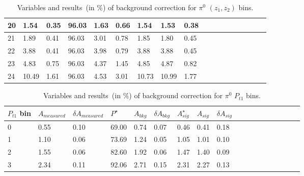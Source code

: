 \begin{table}[H]
\begin{tabular}{|l|l|l|l|l|l|l|l|l|l|l|l|l|l|l|l|l|l|}
20 & 1.54 & 0.35 & 96.03 & 1.63 & 0.66 & 1.54 & 1.53 & 0.38 \\ \hline 
21 & 1.89 & 0.41 & 96.03 & 3.01 & 0.78 & 1.85 & 1.80 & 0.45 \\ \hline 
22 & 3.88 & 0.41 & 96.03 & 3.98 & 0.79 & 3.88 & 3.88 & 0.45 \\ \hline 
23 & 4.83 & 0.75 & 96.03 & 4.37 & 1.45 & 4.85 & 4.87 & 0.82 \\ \hline 
24 & 10.49 & 1.61 & 96.03 & 4.53 & 3.01 & 10.73 & 10.99 & 1.77 \\ \hline 
\end{tabular}
\caption{Variables and results~(in $\%$) of background correction for $\pi^0$ $(z_1,z_2)$ bins. }
\label{tab:comzbkgcor}
\end{table} 

\begin{table}[H]\footnotesize
\centering
\begin{tabular}{|l|l|l|l|l|l|l|l|l|l|l|l|l|l|l|l|l|l|}
\\ \hline
$P_{t1}$ bin & $A_{measured}$ & $\delta A_{measured}$ & $P^{\star}$& $A_{bkg}$ & $\delta A_{bkg}$ & $A_{sig}^{\star}$ & $ A_{sig}$ & $\delta A_{sig}$ \\ \hline
0 & 0.55 & 0.10 & 69.00 & 0.74 & 0.07 & 0.46 & 0.41 & 0.18 \\ \hline 
1 & 1.10 & 0.06 & 73.69 & 1.24 & 0.05 & 1.05 & 1.01 & 0.10 \\ \hline 
2 & 1.55 & 0.06 & 82.60 & 1.92 & 0.06 & 1.47 & 1.40 & 0.09 \\ \hline 
3 & 2.34 & 0.11 & 92.06 & 2.71 & 0.15 & 2.31 & 2.27 & 0.13 \\ \hline 
\end{tabular}
\caption{Variables and results~(in $\%$) of background correction for $\pi^0$ $P_{t1}$ bins. }
\label{tab:sinptbkgcor}
\end{table}

